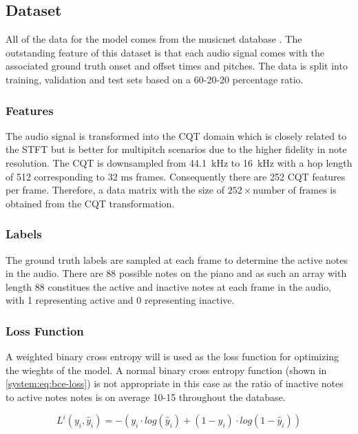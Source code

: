 \subsection{Dataset}

All of the data for the model comes from the musicnet database \cite{thickstun2018invariances}.
The outstanding feature of this dataset is that each audio signal comes with the associated ground truth
onset and offset times and pitches. The data is split into training, validation and test sets based on a 60-20-20
percentage ratio.

\subsubsection{Features}
The audio signal is transformed into the \ac{CQT} domain
which is closely related to the STFT but is better for multipitch scenarios due
to the higher fidelity in note resolution. The \ac{CQT} is downsampled from
44.1~$\si{\kilo\hertz}$ to 16~$\si{\kilo\hertz}$ with a hop length of 512
corresponding to 32 $\si{\milli\second}$ frames. Consequently there are 252 \ac{CQT}
features per frame. Therefore, a data matrix with the size of $252 \times
    \text{number of frames}$ is obtained from the \ac{CQT} transformation.

\subsubsection{Labels}
The ground truth labels are sampled at each frame to determine the active notes
in the audio. There are 88 possible notes on the piano and as such an array with
length 88 constitues the active and inactive notes at each frame in the audio,
with 1 representing active and 0 representing inactive.

\subsubsection{Loss Function}

A weighted binary cross entropy will is used as the loss function for optimizing
the wieghts of the model. A normal binary cross entropy function (shown in \autoref{system:eq:bce-loss}) is not
appropriate in this case as the ratio of inactive notes to active notes notes is
on average 10-15 throughout the database.

\begin{equation}
    L^{i} (y_{i}, \hat{y}_{i}) = -(y_{i}\cdot log(\hat{y}_{i}) + (1-y_{i}) \cdot log(1-\hat{y}_{i}))
    \label{system:eq:bce-loss}
\end{equation}

